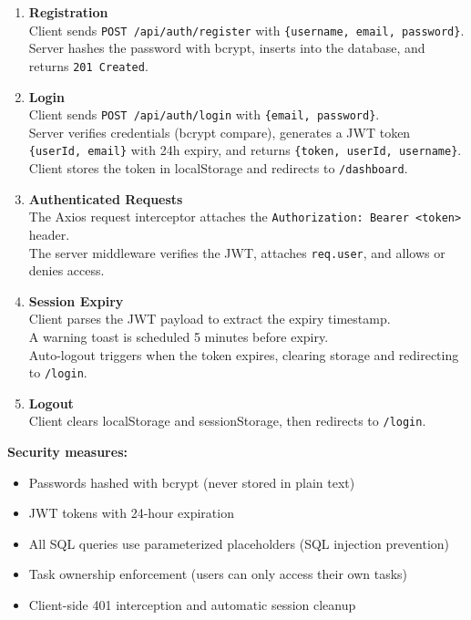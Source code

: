 \documentclass[12pt, a4paper]{article}
\begin{document}
\begin{enumerate}[nosep]
    \item \textbf{Registration}\\
    Client sends \texttt{POST /api/auth/register} with \texttt{\{username, email, password\}}.\\
    Server hashes the password with bcrypt, inserts into the database, and returns \texttt{201 Created}.

    \item \textbf{Login}\\
    Client sends \texttt{POST /api/auth/login} with \texttt{\{email, password\}}.\\
    Server verifies credentials (bcrypt compare), generates a JWT token \texttt{\{userId, email\}} with 24h expiry, and returns \texttt{\{token, userId, username\}}.\\
    Client stores the token in localStorage and redirects to \texttt{/dashboard}.

    \item \textbf{Authenticated Requests}\\
    The Axios request interceptor attaches the \texttt{Authorization: Bearer <token>} header.\\
    The server middleware verifies the JWT, attaches \texttt{req.user}, and allows or denies access.

    \item \textbf{Session Expiry}\\
    Client parses the JWT payload to extract the expiry timestamp.\\
    A warning toast is scheduled 5 minutes before expiry.\\
    Auto-logout triggers when the token expires, clearing storage and redirecting to \texttt{/login}.

    \item \textbf{Logout}\\
    Client clears localStorage and sessionStorage, then redirects to \texttt{/login}.
\end{enumerate}

\vspace{0.5em}
\textbf{Security measures:}
\begin{itemize}[nosep]
    \item Passwords hashed with bcrypt (never stored in plain text)
    \item JWT tokens with 24-hour expiration
    \item All SQL queries use parameterized placeholders (SQL injection prevention)
    \item Task ownership enforcement (users can only access their own tasks)
    \item Client-side 401 interception and automatic session cleanup
\end{itemize}
\end{document}

